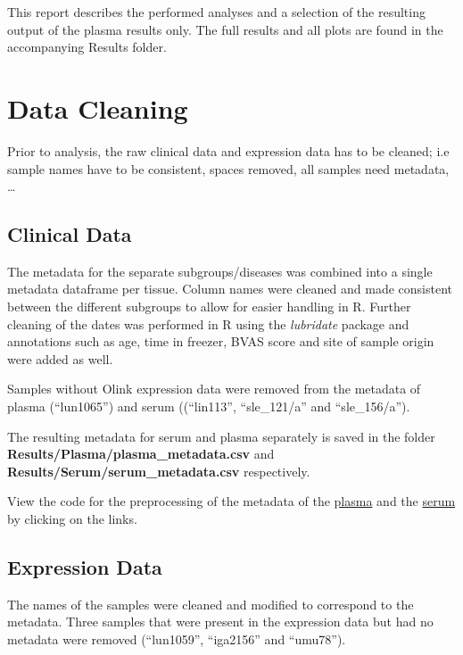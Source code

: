 \documentclass[
]{book}
\begin{document}
This report describes the performed analyses and a selection of the resulting
output of the plasma results only. The full results and all plots are found in
the accompanying Results folder.

\hypertarget{data-cleaning}{%
\chapter{Data Cleaning}\label{data-cleaning}}

Prior to analysis, the raw clinical data and expression data has to be cleaned; i.e sample names have to be consistent, spaces removed, all samples need metadata, \ldots{}

\hypertarget{clinical-data}{%
\section{Clinical Data}\label{clinical-data}}

The metadata for the separate subgroups/diseases was combined into a single metadata dataframe per tissue. Column names were cleaned and made consistent between the different subgroups to allow for easier handling in R. Further cleaning of the dates was performed in R using the \emph{lubridate} package and annotations such as age, time in freezer, BVAS score and site of sample origin were added as well.

Samples without Olink expression data were removed from the metadata of plasma (``lun1065'') and serum ((``lin113'', ``sle\_121/a'' and ``sle\_156/a'').

The resulting metadata for serum and plasma separately is saved in the folder
\textbf{Results/Plasma/plasma\_metadata.csv} and \textbf{Results/Serum/serum\_metadata.csv}
respectively.

View the code for the preprocessing of the metadata of the
\href{https://raw.githubusercontent.com/vincent-van-hoef/Analysis5204/master/data-raw/plasma_metadata.R}{plasma}
and the
\href{https://raw.githubusercontent.com/vincent-van-hoef/Analysis5204/master/data-raw/serum_metadata.R}{serum}
by clicking on the links.

\hypertarget{expression-data}{%
\section{Expression Data}\label{expression-data}}

The names of the samples were cleaned and modified to correspond to the metadata.
Three samples that were present in the expression data but had no metadata were
removed (``lun1059'', ``iga2156'' and ``umu78'').
\end{document}
